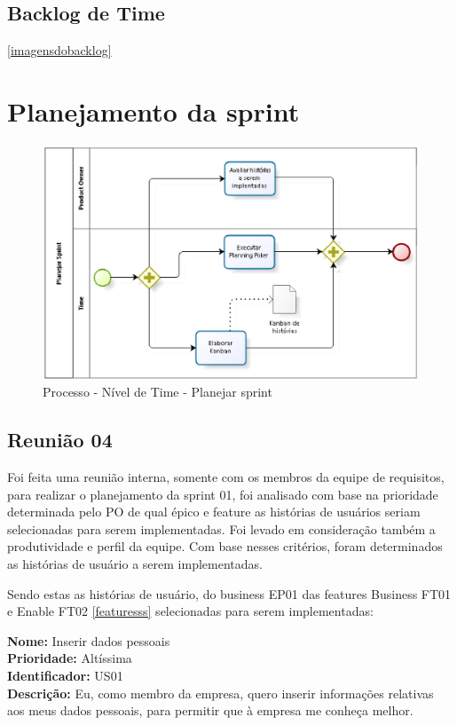 \subsection{Backlog de Time}
 \ref{imagensdobacklog}

\section{Planejamento da sprint}
\begin{figure}[H]
    \centering
    \label{identificarPlanejar}
    \includegraphics[keepaspectratio=true,scale=0.6]{figuras/processoPlanejar.eps}
    \caption[Planejar sprint]{Processo - Nível de Time - Planejar sprint}
\end{figure}

\subsection{Reunião 04}
Foi feita uma reunião interna, somente com os membros da equipe de requisitos, para realizar o planejamento da sprint 01, foi analisado com base na prioridade determinada pelo PO de qual épico e feature as histórias de usuários seriam selecionadas para serem implementadas. Foi levado em consideração também a produtividade e perfil da equipe. Com base nesses critérios, foram determinados as histórias de usuário a serem implementadas. 

Sendo estas as histórias de usuário, do business EP01 das features Business FT01 e Enable FT02 \ref{featuresss} selecionadas para serem implementadas: 

 \indent \textbf{Nome:} Inserir dados pessoais\\
 \indent \textbf{Prioridade:} Altíssima\\
 \indent \textbf{Identificador:} US01\\
 \indent \textbf{Descrição:} Eu, como membro da empresa, quero inserir informações relativas aos meus dados pessoais, para permitir que à empresa me conheça melhor.\\

